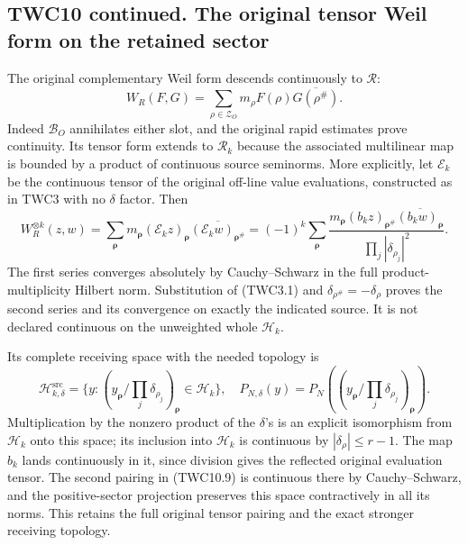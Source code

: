 \subsection{TWC10 continued. The original tensor Weil form on the
retained
sector}\label{twc10-continued.-the-original-tensor-weil-form-on-the-retained-sector}

The original complementary Weil form descends continuously to
\(\mathcal R\): \[
W_R(F,G)=\sum_{\rho\in\mathscr Z_O}m_\rho F(\rho)\overline{G(\rho^\#)}.
\tag{TWC10.8}
\] Indeed \(\mathcal B_O\) annihilates either slot, and the original
rapid estimates prove continuity. Its tensor form extends to
\(\mathscr R_k\) because the associated multilinear map is bounded by a
product of continuous source seminorms. More explicitly, let
\(\mathcal E_k\) be the continuous tensor of the original off-line value
evaluations, constructed as in TWC3 with no \(\delta\) factor. Then \[
W_R^{\otimes k}(z,w)=\sum_{\boldsymbol\rho}m_{\boldsymbol\rho}
 (\mathcal E_kz)_{\boldsymbol\rho}
 \overline{(\mathcal E_kw)_{\boldsymbol\rho^\#}}
=(-1)^k\sum_{\boldsymbol\rho}
\frac{m_{\boldsymbol\rho}(b_kz)_{\boldsymbol\rho^\#}
\overline{(b_kw)_{\boldsymbol\rho}}}{\prod_j|\delta_{\rho_j}|^2}.
\tag{TWC10.9}
\] The first series converges absolutely by Cauchy--Schwarz in the full
product-multiplicity Hilbert norm. Substitution of (TWC3.1) and
\(\delta_{\rho^\#}=-\delta_\rho\) proves the second series and its
convergence on exactly the indicated source. It is not declared
continuous on the unweighted whole \(\mathscr H_k\).

Its complete receiving space with the needed topology is \[
\mathscr H_{k,\delta}^{\mathrm{src}}=
\{y:(y_{\boldsymbol\rho}/\prod_j\delta_{\rho_j})_{\boldsymbol\rho}\in\mathscr H_k\},
\quad P_{N,\delta}(y)=P_N((y_{\boldsymbol\rho}/\prod_j\delta_{\rho_j})_{\boldsymbol\rho}).
\tag{TWC10.10}
\] Multiplication by the nonzero product of the \(\delta\)'s is an
explicit isomorphism from \(\mathscr H_k\) onto this space; its
inclusion into \(\mathscr H_k\) is continuous by
\(|\delta_\rho|\le r-1\). The map \(b_k\) lands continuously in it,
since division gives the reflected original evaluation tensor. The
second pairing in (TWC10.9) is continuous there by Cauchy--Schwarz, and
the positive-sector projection preserves this space contractively in all
its norms. This retains the full original tensor pairing and the exact
stronger receiving topology.

